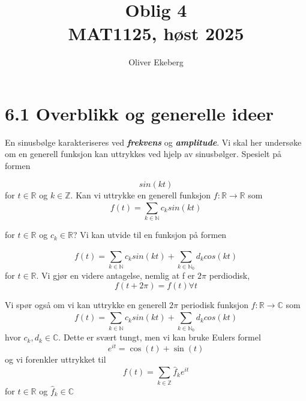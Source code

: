 \documentclass[a4paper,norsk]{article}
\title{Oblig 4 \\ MAT1125, høst 2025}
\author{Oliver Ekeberg}
\begin{document}
\maketitle

\tableofcontents

\section*{6.1 Overblikk og generelle ideer}

En sinusbølge karakteriseres ved \textbf{\textit{frekvens}} og \textbf{\textit{amplitude}}. Vi skal her undersøke om en generell funksjon kan uttrykkes ved hjelp av sinusbølger. Spesielt på formen

\[
    sin(kt)
\]
for $ t \in \mathbb{R} $ og $ k \in \mathbb{Z} $. Kan vi uttrykke en generell funksjon $ f: \mathbb{R} \rightarrow \mathbb{R} $ som
\[
    f(t) = \sum_{ k \in \mathbb{N} }^{  } c_k sin(kt) 
\]

for $ t \in \mathbb{R} $ og $ c_k \in \mathbb{R} $? Vi kan utvide til en funksjon på formen

\[
    f(t) = \sum_{ k \in \mathbb{N} }^{  } c_k sin(kt) + \sum_{ k \in \mathbb{N}_0 }^{  } d_k cos(kt)
\]
for $ t \in \mathbb{R} $. Vi gjør en videre antagelse, nemlig at f er $ 2\pi $ perdiodisk,
\[
    f(t + 2\pi) = f(t) \forall t
\]

Vi spør også om vi kan uttrykke en generell $ 2\pi $ periodisk funksjon $ f: \mathbb{R} \rightarrow \mathbb{C} $ som
\[
    f(t) = \sum_{ k \in \mathbb{N} }^{  } c_k sin(kt) + \sum_{ k \in \mathbb{N}_0 }^{  } d_k cos(kt)
\]
hvor $ c_k, d_k \in  \mathbb{C} $. Dette er svært tungt, men vi kan bruke Eulers formel
\[
    e^{it} = \cos(t) + \sin(t)
\]
og vi forenkler uttrykket til
\[
    f(t) = \sum_{ k \in \mathbb{Z} }^{  } \hat{f}_k e^{it}
\]
for $ t \in  \mathbb{R} $ og $ \hat{f}_k \in \mathbb{C} $ 
\end{document}
